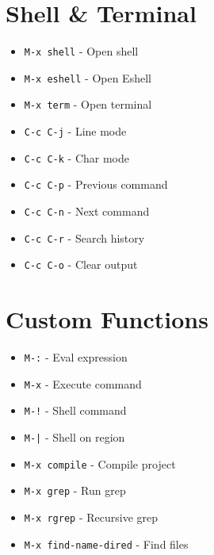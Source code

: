 \documentclass[6pt,landscape]{article}
\newcommand{\key}[1]{\texttt{#1}}
\begin{document}
\begin{multicols*}{5}
\section*{Shell \& Terminal}
\begin{itemize}[leftmargin=*,itemsep=0pt,parsep=0pt,topsep=0pt]
\item \key{M-x shell} - Open shell
\item \key{M-x eshell} - Open Eshell
\item \key{M-x term} - Open terminal
\item \key{C-c C-j} - Line mode
\item \key{C-c C-k} - Char mode
\item \key{C-c C-p} - Previous command
\item \key{C-c C-n} - Next command
\item \key{C-c C-r} - Search history
\item \key{C-c C-o} - Clear output
\end{itemize}

\section*{Custom Functions}
\begin{itemize}[leftmargin=*,itemsep=0pt,parsep=0pt,topsep=0pt]
\item \key{M-:} - Eval expression
\item \key{M-x} - Execute command
\item \key{M-!} - Shell command
\item \key{M-|} - Shell on region
\item \key{M-x compile} - Compile project
\item \key{M-x grep} - Run grep
\item \key{M-x rgrep} - Recursive grep
\item \key{M-x find-name-dired} - Find files
\end{itemize}


\end{multicols*}
\end{document}
